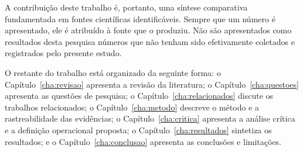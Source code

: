 A contribuição deste trabalho é, portanto, uma síntese comparativa fundamentada em fontes científicas identificáveis. Sempre que um número é apresentado, ele é atribuído à fonte que o produziu. Não são apresentados como resultados desta pesquisa números que não tenham sido efetivamente coletados e registrados pelo presente estudo.

O restante do trabalho está organizado da seguinte forma: o Capítulo~\ref{cha:revisao} apresenta a revisão da literatura; o Capítulo~\ref{cha:questoes} apresenta as questões de pesquisa; o Capítulo~\ref{cha:relacionados} discute os trabalhos relacionados; o Capítulo~\ref{cha:metodo} descreve o método e a rastreabilidade das evidências; o Capítulo~\ref{cha:critica} apresenta a análise crítica e a definição operacional proposta; o Capítulo~\ref{cha:resultados} sintetiza os resultados; e o Capítulo~\ref{cha:conclusao} apresenta as conclusões e limitações.
